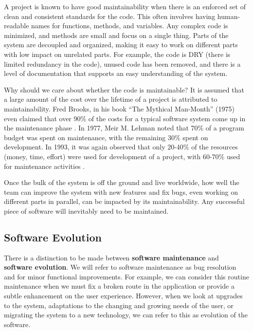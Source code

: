 A project is known to have good maintainability when there is an enforced set of clean and consistent standards for the code. This often involves having human-readable names for functions, methods, and variables. Any complex code is minimized, and methods are small and focus on a single thing. Parts of the system are decoupled and organized, making it easy to work on different parts with low impact on unrelated parts. For example, the code is DRY (there is limited redundancy in the code), unused code has been removed, and there is a level of documentation that supports an easy understanding of the system.

Why should we care about whether the code is maintainable? It is assumed that a large amount of the cost over the lifetime of a project is attributed to maintainability. Fred Brooks, in his book ``The Mythical Man-Month'' (1975) even claimed that over 90\% of the costs for a typical software system come up in the maintenance phase \cite{brooks:mythical}. In 1977, Meir M. Lehman noted that 70\% of a program budget was spent on maintenance, with the remaining 30\% spent on development. In 1993, it was again observed that only 20-40\% of the resources (money, time, effort) were used for development of a project, with 60-70\% used for maintenance activities \cite{ieee:1219}.

Once the bulk of the system is off the ground and live worldwide, how well the team can improve the system with new features and fix bugs, even working on different parts in parallel, can be impacted by its maintainability. Any successful piece of software will inevitably need to be maintained.


\subsection{Software Evolution} \label{subSoftwareEvolution}

There is a distinction to be made between \textbf{software maintenance} and \textbf{software evolution}. We will refer to software maintenance as bug resolution and for minor functional improvements. For example, we can consider this routine maintenance when we must fix a broken route in the application or provide a subtle enhancement on the user experience. However, when we look at upgrades to the system, adaptations to the changing and growing needs of the user, or migrating the system to a new technology, we can refer to this as evolution of the software.

